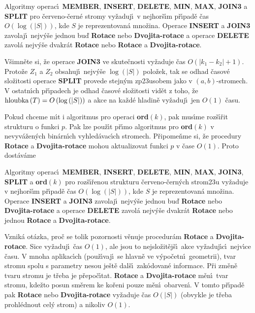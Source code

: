 Algoritmy operac\'\i\ {\bf MEMBER}, {\bf INSERT}, 
{\bf DE\-LE\-TE}, {\bf MIN}, {\bf MAX}, {\bf JOIN3} a {\bf SPLIT} pro \v cerveno-\v cern\'e 
stro\-my vy\v zaduj\'\i\ v nejhor\v s\'\i m p\v r\'\i pad\v e \v cas $O
\left(\log\left(|S|\right)\right)$, kde $S$ je 
reprezentovan\'a mno\v zina.  Operace {\bf INSERT} a {\bf JOIN3} zavolaj\'\i\ 
nejv\'y\v se jednou bu\v d {\bf Rotace} nebo {\bf Dvojita-rota\-ce} a operace 
{\bf DE\-LE\-TE} zavol\'a nejv\'y\v se dvakr\'at {\bf Rotace} nebo {\bf Rotace} a 
{\bf Dvojita-ro\-ta\-ce}.  
\endproclaim

\flushpar V\v simn\v ete si, \v ze operace {\bf JOIN3} ve skute\v cnosti 
vy\v zaduje \v cas $O\left(|k_1-k_2|+1\right)$. Proto\v ze $Z_1$ a $Z_2$ obsahuj\'\i\ nejv\'y\v se 
$\log\left(|S|\right)$ polo\v zek, tak se odhad \v casov\'e slo\v zitosti operace {\bf SPLIT }
prove\-de stejn\'ym zp\accent23usobem jako v $\left(a,b\right)$-stromech. 
V ostatn\'\i ch p\v r\'\i\-pa\-dech je odhad \v casov\'e slo\v zitosti vid\v et z toho, 
\v ze $\operatorname{hloubka}\left(T\right)=O\left(\log\left(|S|\right)\right)$ a akce na ka\v zd\'e hladin\v e vy\v zaduj\'\i\ jen 
$O\left(1\right)$ \v casu.
\medskip

\flushpar Pokud chceme m\'\i t i algoritmus pro operaci {\bf ord$
\left(k\right)$}, pak 
mus\'\i me roz\v s\'\i\v rit strukturu o funkci $p$. Pak lze pou\v z\'\i t p\v r\'\i mo 
algoritmus pro {\bf ord$\left(k\right)$} v nevyv\'a\v zen\'ych bin\'arn\'\i ch vyhled\'avac\'\i ch 
stromech. P\v ripome\v nme si, \v ze procedury {\bf Rotace} a {\bf Dvojita-rotace }
mohou aktualizovat funkci $p$ v \v case $O\left(1\right)$. Proto dost\'av\'ame 

Algoritmy operac\'\i\ {\bf MEMBER}, 
{\bf INSERT}, {\bf DE\-LE\-TE}, {\bf MIN}, {\bf MAX}, {\bf JOIN3}, {\bf SPLIT} a {\bf ord$
\left(k\right)$} pro 
roz\-\v s\'\i\-\v re\-nou strukturu \v cerveno-\v cern\'ych strom\accent23u vy\v zaduje 
v nejhor\v s\'\i m p\v r\'\i pad\v e \v cas $O\left(\log\left(|S|\right)\right)$, kde $S$ je reprezentovan\'a 
mno\v zina.  Operace {\bf INSERT} a {\bf JOIN3} zavolaj\'\i\ nejv\'y\v se jednou bu\v d 
{\bf Rotace} nebo {\bf Dvojita-rota\-ce} a operace {\bf DELETE} zavol\'a nejv\'y\v se 
dvakr\'at {\bf Rotace} nebo jednou {\bf Rotace} a {\bf Dvojita-rotace}.  \endproclaim


\flushpar Vznik\'a ot\'azka, pro\v c se tolik pozornosti v\v enuje 
procedur\'am {\bf Rotace} a {\bf Dvojita-rotace}. Sice vy\v zaduj\'\i\ \v cas 
$O\left(1\right)$, ale jsou to nej\-slo\v zit\v ej\v s\'\i\ akce vy\v zaduj\'\i c\'\i\ nejv\'\i ce \v casu. 
V mnoha aplikac\'\i ch (pou\-\v z\'\i vaj\'\i\ se hlavn\v e ve v\'ypo\v cetn\'\i\ geometrii), 
tvar stromu spolu s parametry nesou je\v st\v e 
dal\v s\'\i\ zak\'odovan\'e informace. P\v ri zm\v en\v e tvaru stromu je 
t\v reba je p\v repo\v c\'\i tat. {\bf Rotace} a {\bf Dvojita-rotace} m\v en\'\i\ tvar 
stromu, kde\v zto posun sm\v erem ke ko\v reni pouze m\v en\'\i\ 
obarven\'\i . V tomto p\v r\'\i pad\v e pak {\bf Rotace} nebo {\bf Dvo\-ji\-ta-rotace }
vy\v zaduje \v cas $O\left(|S|\right)$ (obvykle je t\v reba prohl\'ednout cel\'y 
strom) a nikoliv $O\left(1\right)$.
\medskip

